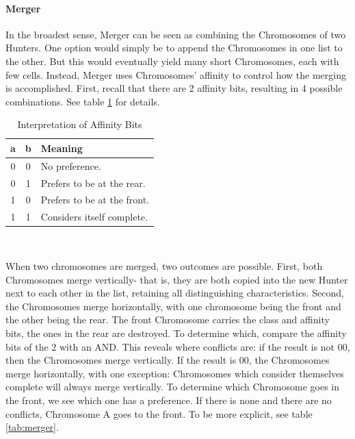 \paragraph{Merger}
In the broadest sense, Merger can be seen as combining the Chromosomes of two Hunters.  One option would simply be to append the Chromosomes in one list to the other.  But this would eventually yield many short Chromosomes, each with few cells.  Instead, Merger uses Chromosomes' affinity to control how the merging is accomplished.  First, recall that there are 2 affinity bits, resulting in 4 possible combinations. See table \ref{tab:affinity} for details.\\
\begin{table}
\centering

\begin{tabular}{|c c | l|}
	\hline
	a & b & Meaning \\
	\hline
	0 & 0 & No preference.\\
	0 & 1 & Prefers to be at the rear.\\
	1 & 0 & Prefers to be at the front.\\
	1 & 1 & Considers itself complete.\\
	\hline
\end{tabular}\\
\caption{Interpretation of Affinity Bits}
\label{tab:affinity}
\end{table}
When two chromosomes are merged, two outcomes are possible.  First, both Chromosomes merge vertically- that is, they are both copied into the new Hunter next to each other in the list, retaining all distinguishing characteristics.  Second, the Chromosomes merge horizontally, with one chromosome being the front and the other being the rear.  The front Chromosome carries the class and affinity bits, the ones in the rear are destroyed.  To determine which, compare the affinity bits of the 2 with an AND.  This reveals where conflicts are: if the result is not 00, then the Chromosomes merge vertically.  If the result is 00, the Chromosomes merge horizontally, with one exception: Chromosomes which consider themselves complete will always merge vertically.
To determine which Chromosome goes in the front, we see which one has a preference. If there is none and there are no conflicts, Chromosome A goes to the front.  To be more explicit, see table \ref{tab:merger}.\\
